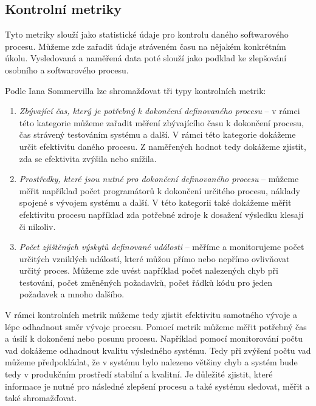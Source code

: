 \documentclass[czech,master,public,dept460,male,cpdeclaration,oneside]{diploma}
\begin{document}
\subsection{Kontrolní metriky}
Tyto metriky slouží jako statistické údaje pro kontrolu daného softwarového procesu. Můžeme zde zařadit údaje stráveném času na nějakém konkrétním úkolu. Vysledovaná a naměřená data poté slouží jako podklad ke zlepšování osobního a softwarového procesu. 

Podle Iana Sommervilla \cite{ref:kontrolni_metriky} lze shromažďovat tři typy kontrolních metrik:

\begin{enumerate}
\item \textit{Zbývající čas, který je potřebný k dokončení definovaného procesu} -- v rámci této kategorie můžeme zařadit měření zbývajícího času k dokončení procesu, čas strávený testováním systému a další. V rámci této kategorie dokážeme určit efektivitu daného procesu. Z naměřených hodnot tedy dokážeme zjistit, zda se efektivita zvýšila nebo snížila.

\item \textit{Prostředky, které jsou nutné pro dokončení definovaného procesu} -- můžeme měřit například počet programátorů k dokončení určitého procesu, náklady spojené s vývojem systému a další. V této kategorii také dokážeme měřit efektivitu procesu například zda potřebné zdroje k dosažení výsledku klesají či nikoliv.

\item \textit{Počet zjištěných výskytů definované události} -- měříme a monitorujeme počet určitých vzniklých událostí, které můžou přímo nebo nepřímo ovlivňovat určitý proces. Můžeme zde uvést například počet nalezených chyb při testování, počet změněných požadavků, počet řádků kódu pro jeden požadavek a mnoho dalšího.

\end{enumerate}

V rámci kontrolních metrik můžeme tedy zjistit efektivitu samotného vývoje a lépe odhadnout směr vývoje procesu. Pomocí metrik můžeme měřit potřebný čas a úsilí k dokončení nebo posunu procesu. Například pomocí monitorování počtu vad dokážeme odhadnout kvalitu výsledného systému. Tedy při zvýšení počtu vad můžeme předpokládat, že v systému bylo nalezeno většiny chyb a systém bude tedy v produkčním prostředí stabilní a kvalitní. Je důležité zjistit, které informace je nutné pro následné zlepšení procesu a také systému sledovat, měřit a také shromažďovat.
\end{document}
